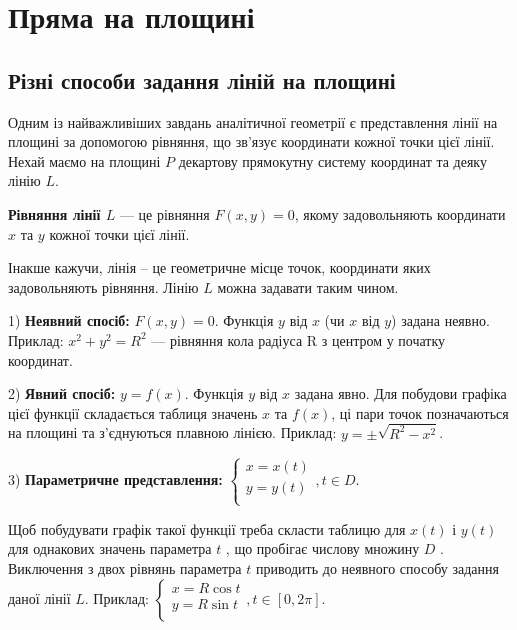 \chapter{Пряма на площині}

\section{Різні способи задання ліній на площині}

Одним із найважливіших завдань аналітичної геометрії є представлення лінії
на площині за допомогою рівняння, що зв’язує координати кожної точки цієї лінії.
Нехай маємо на площині $P$ декартову прямокутну систему координат та деяку
лінію $L$.

\begin{definition}
	\textbf{Рівняння лінії $L$} --- це рівняння $F(x,y) = 0$, якому задовольняють
	координати $x$ та $y$ кожної точки цієї лінії. 
\end{definition}

Інакше кажучи, лінія – це геометричне місце точок, координати яких
задовольняють рівняння. Лінію $L$ можна задавати таким чином. 

1) \textbf{Неявний спосіб:} $F(x,y) = 0$. Функція $y$ від $x$ (чи $x$ від $y$) задана неявно.
Приклад: $x^2 + y^2 = R^2$ --- рівняння кола радіуса R з центром у початку координат.

2) \textbf{Явний спосіб:} $y = f(x)$. Функція $y$ від $x$ задана явно. Для побудови графіка
цієї функції складається таблиця значень $x$ та $f(x)$, ці пари точок позначаються на
площині та з’єднуються плавною лінією.
Приклад: $y = \pm\sqrt{R^2 - x^2}$. 

3) \textbf{Параметричне представлення:} $\left\{\begin{array}{l}
	x = x(t) \\
	y = y(t) \\	
\end{array}\right., t \in D$.
	
Щоб побудувати графік
такої функції треба скласти таблицю для $x(t)$ і $y(t)$ для однакових значень
параметра $t$ , що пробігає числову множину $D$ . Виключення з двох рівнянь
параметра $t$ приводить до неявного способу задання даної лінії $L$. 
Приклад: $\left\{\begin{array}{l}
	x = R\cos t \\
	y = R\sin t \\	
\end{array}\right., t \in [0, 2\pi]$.

